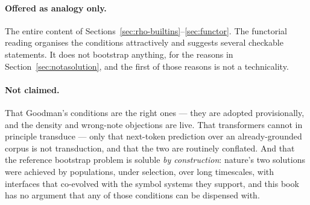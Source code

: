 \paragraph{Offered as analogy only.}
The entire content of
Sections~\ref{sec:rho-builtins}--\ref{sec:functor}.
The functorial reading organises the conditions attractively and
suggests several checkable statements.
It does not bootstrap anything, for the reasons in
Section~\ref{sec:notasolution}, and the first of those reasons is
not a technicality.

\paragraph{Not claimed.}
That Goodman's conditions are the right ones --- they are adopted
provisionally, and the density and wrong-note objections are live.
That transformers cannot in principle transduce --- only that
next-token prediction over an already-grounded corpus is not
transduction, and that the two are routinely conflated.
And that the reference bootstrap problem is soluble \emph{by
construction}: nature's two solutions were achieved by populations,
under selection, over long timescales, with interfaces that
co-evolved with the symbol systems they support, and this book has
no argument that any of those conditions can be dispensed with.
